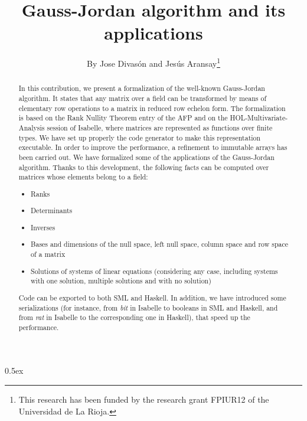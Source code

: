 \documentclass[11pt,a4paper]{article}
\begin{document}
\title{Gauss-Jordan algorithm and its applications}
\author{By Jose Divas\'on and Jes\'us Aransay\thanks{This research has been funded by 
  the research grant FPIUR12 of the Universidad de La Rioja.}}
\maketitle


\begin{abstract}
In this contribution, we present a formalization of the well-known Gauss-Jordan algorithm.
It states that any matrix over a field can be transformed by means of elementary row operations to a
matrix in reduced row echelon form. The formalization is based on the
Rank Nullity Theorem entry of the AFP and on the HOL-Multivariate-Analysis session of Isabelle, 
where matrices are represented as functions over finite types. We have set up properly 
the code generator to make this representation executable. In order to improve the 
performance, a refinement to immutable arrays has been carried out. We have formalized some of the applications
of the Gauss-Jordan algorithm. Thanks to this development, the 
following facts can be computed over matrices whose elements belong to a field:

\begin{itemize}
 \item Ranks
 \item Determinants
 \item Inverses
 \item Bases and dimensions of the null space, left null space, column space and row space of a matrix
 \item Solutions of systems of linear equations (considering any case, 
	including systems with one solution, multiple solutions and with no solution)
\end{itemize}

Code can be exported to both SML and Haskell. In addition, we have introduced some serializations 
(for instance, from \emph{bit} in Isabelle to booleans in SML and Haskell, 
and from \emph{rat} in Isabelle to the corresponding one in Haskell), that speed up the performance.

\end{abstract}

\tableofcontents

\parindent 0pt\parskip 0.5ex





\end{document}
